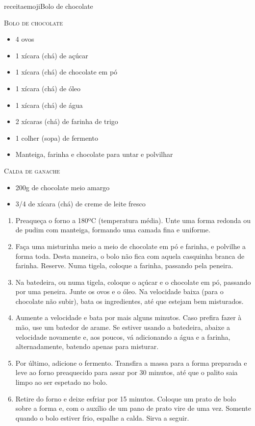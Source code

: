 receitaemoji{Bolo de chocolate}{ %
	\textsc{Bolo de chocolate}
	\begin{itemize}
		\item 4 ovos
		\item 1 xícara (chá) de açúcar
		\item 1 xícara (chá) de chocolate em pó
		\item 1 xícara (chá) de óleo
		\item 1 xícara (chá) de água
		\item 2 xícaras (chá) de farinha de trigo
		\item 1 colher (sopa) de fermento
		\item Manteiga, farinha e chocolate para untar e polvilhar
	\end{itemize}
	\textsc{Calda de ganache}
	\begin{itemize}
		\item 200g de chocolate meio amargo
		\item 3/4 de xícara (chá) de creme de leite fresco
	\end{itemize}
}{
	\begin{enumerate}
		\item Preaqueça o forno a 180ºC (temperatura média). Unte uma forma redonda ou
		      de pudim com manteiga, formando uma camada fina e uniforme.
		\item Faça uma misturinha meio a meio de chocolate em pó e farinha, e polvilhe
		      a forma toda. Desta maneira, o bolo não fica com aquela casquinha branca de
		      farinha. Reserve. Numa tigela, coloque a farinha, passando pela peneira.
		\item Na batedeira, ou numa tigela, coloque o açúcar e o chocolate em pó,
		      passando por uma peneira. Junte os ovos e o óleo. Na velocidade baixa (para
		      o chocolate não subir), bata os ingredientes, até que estejam bem
		      misturados.
		\item Aumente a velocidade e bata por mais alguns minutos. Caso prefira fazer
		      à mão, use um batedor de arame. Se estiver usando a batedeira, abaixe a
		      velocidade novamente e, aos poucos, vá adicionando a água e a farinha,
		      alternadamente, batendo apenas para misturar.
		\item Por último, adicione o fermento. Transfira a massa para a forma
		      preparada e leve ao forno preaquecido para assar por 30 minutos, até que o
		      palito saia limpo ao ser espetado no bolo.
		\item Retire do forno e deixe esfriar por 15 minutos. Coloque um prato de bolo
		      sobre a forma e, com o auxílio de um pano de prato vire de uma vez. Somente
		      quando o bolo estiver frio, espalhe a calda. Sirva a seguir.
	\end{enumerate}
}

